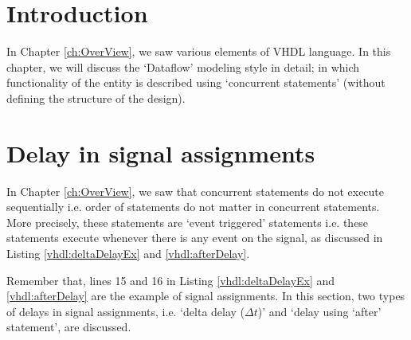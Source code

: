 \section{Introduction}
In Chapter \ref{ch:OverView}, we saw various elements of VHDL language. In this chapter, we will discuss the `Dataflow' modeling style in detail; in which functionality of the entity is described using `concurrent statements' (without defining the structure of the design). 


\section{Delay in signal assignments}
In Chapter \ref{ch:OverView}, we saw that concurrent statements do not execute sequentially i.e. order of statements do not matter in concurrent statements. More precisely, these statements are `event triggered' statements i.e. these statements execute whenever there is any event on the signal, as discussed in Listing \ref{vhdl:deltaDelayEx} and \ref{vhdl:afterDelay}.

Remember that, lines 15 and 16 in Listing \ref{vhdl:deltaDelayEx} and \ref{vhdl:afterDelay} are the example of signal assignments. In this section, two types of delays in signal assignments, i.e. `delta delay ($\Delta t$)' and `delay using `after' statement', are discussed. 

